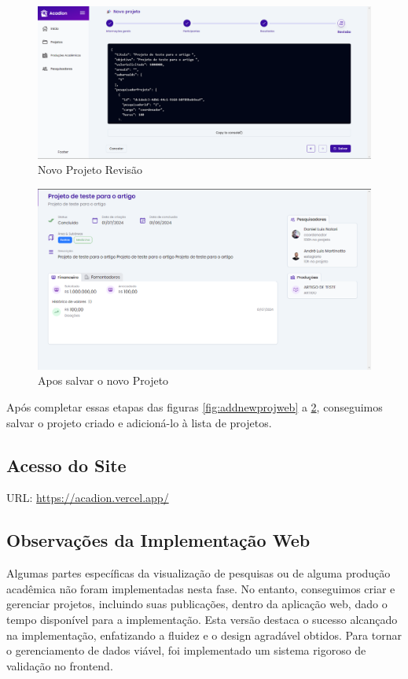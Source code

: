 \begin{figure}[H]
    \centering
    \includegraphics[width=1\linewidth]{figuras/NovoProjetoRevisao.png}
    \caption{Novo Projeto Revisão}
    \label{fig:enter-label}
\end{figure}

\begin{figure}[H]
    \centering
    \includegraphics[width=1\linewidth]{figuras/NovoProjeto.png}
    \caption{Apos salvar o novo Projeto}
    \label{fig:newprojcreateweb}
\end{figure}

Após completar essas etapas das figuras \ref{fig:addnewprojweb} a \ref{fig:newprojcreateweb}, conseguimos salvar o projeto criado e adicioná-lo à lista de projetos.
\subsection{Acesso do Site}
URL: \hyperlink{https://acadion.vercel.app/}{https://acadion.vercel.app/}

\subsection{Observações da Implementação Web}
Algumas partes específicas da visualização de pesquisas ou de alguma produção acadêmica não foram implementadas nesta fase. No entanto, conseguimos criar e gerenciar projetos, incluindo suas publicações, dentro da aplicação web, dado o tempo disponível para a implementação.
Esta versão destaca o sucesso alcançado na implementação, enfatizando a fluidez e o design agradável obtidos. Para tornar o gerenciamento de dados viável, foi implementado um sistema rigoroso de validação no frontend.

